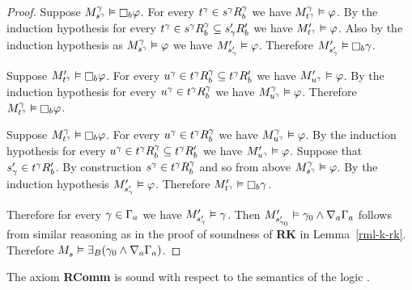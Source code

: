 \begin{proof}
Suppose $\kPModel[\gamma]{\kStateS[\gamma]} \entails \necessaryB \phi$.
For every $\kStateT[\gamma] \in \kSuccessorsB[\gamma]{\kStateS[\gamma]}$ we have $\kPModel[\gamma]{\kStateT[\gamma]} \entails \phi$.
By the induction hypothesis for every $\kStateT[\gamma] \in \kSuccessorsB[\gamma]{\kStateS[\gamma]} \subseteq \kSuccessorsPB{\kStateSP_\gamma}$ we have $\kPModelP{\kStateT[\gamma]} \entails \phi$.
Also by the induction hypothesis as $\kPModel[\gamma]{\kStateS[\gamma]} \entails \phi$ we have $\kPModelP{\kStateSP_\gamma} \entails \phi$.
Therefore $\kPModelP{\kStateSP_\gamma} \entails \necessaryB \gamma$.

Suppose $\kPModelP{\kStateT[\gamma]} \entails \necessaryB \phi$.
For every $\kStateU[\gamma] \in \kSuccessorsB[\gamma]{\kStateT[\gamma]} \subseteq \kSuccessorsPB{\kStateT[\gamma]}$ we have $\kPModelP{\kStateU[\gamma]} \entails \phi$.
By the induction hypothesis for every $\kStateU[\gamma] \in \kSuccessorsB[\gamma]{\kStateT[\gamma]}$ we have $\kPModel[\gamma]{\kStateU[\gamma]} \entails \phi$.
Therefore $\kPModel[\gamma]{\kStateT[\gamma]} \entails \necessaryB \phi$.

Suppose $\kPModel[\gamma]{\kStateT[\gamma]} \entails \necessaryB \phi$.
For every $\kStateU[\gamma] \in \kSuccessorsB[\gamma]{\kStateT[\gamma]}$ we have $\kPModel[\gamma]{\kStateU[\gamma]} \entails \phi$.
By the induction hypothesis for every $\kStateU[\gamma] \in \kSuccessorsB[\gamma]{\kStateT[\gamma]} \subseteq \kSuccessorsPB{\kStateT[\gamma]}$ we have $\kPModelP{\kStateU[\gamma]} \entails \phi$.
Suppose that $\kStateSP_\gamma \in \kSuccessorsPB{\kStateT[\gamma]}$.
By construction $\kStateS[\gamma] \in \kSuccessorsB[\gamma]{\kStateT[\gamma]}$ and so from above $\kPModel[\gamma]{\kStateS[\gamma]} \entails \phi$.
By the induction hypothesis $\kPModelP{\kStateSP_\gamma} \entails \phi$.
Therefore $\kPModelP{\kStateT[\gamma]} \entails \necessaryB \gamma$.

Therefore for every $\gamma \in \Gamma_\agentA$ we have $\kPModelP{\kStateSP_\gamma} \entails \gamma$.
Then $\kPModelP{\kStateSP_{\gamma_0}} \entails \gamma_0 \land \coversA \Gamma_\agentA$ follows from similar reasoning as in the proof of soundness of {\bf RK} in Lemma~\ref{rml-k-rk}.
Therefore $\kPModel{\kStateS} \entails \somerefsBs (\gamma_0 \land \coversA \Gamma_\agentA)$.
\end{proof}

\begin{lemma}
The axiom {\bf RComm} is sound with respect to the semantics of the logic \logicRmlS{}.
\end{lemma}

